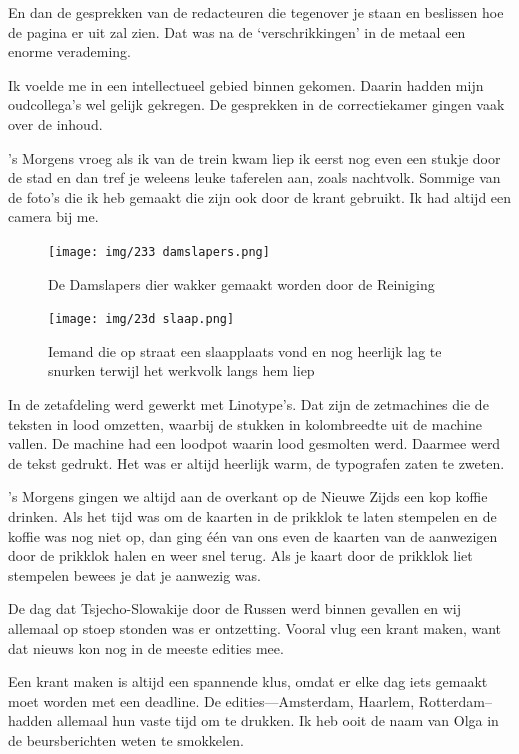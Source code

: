 \documentclass[10pt,twoside, openright]{memoir}
\begin{document}
En dan de gesprekken van de redacteuren die tegenover je staan en beslissen hoe de pagina er uit zal zien. Dat was na de `verschrikkingen' in de metaal een enorme verademing.

Ik voelde me in een intellectueel gebied binnen gekomen. Daarin hadden mijn oudcollega’s wel gelijk gekregen. De gesprekken in de correctiekamer gingen vaak over de inhoud. 

’s Morgens vroeg als ik van de trein kwam liep ik eerst nog even een stukje door de stad en dan tref je weleens leuke taferelen aan, zoals nachtvolk. Sommige van de foto’s die ik heb gemaakt die zijn ook door de krant gebruikt. Ik had altijd een camera bij me.

\begin{figure}
\texttt{[image: img/233 damslapers.png]}
\caption*{\footnotesize De Damslapers dier wakker gemaakt worden door de Reiniging}
\end{figure}

\begin{figure}
\texttt{[image: img/23d slaap.png]}
\caption*{\footnotesize Iemand die op straat een slaapplaats vond en nog heerlijk lag te snurken terwijl het werkvolk langs hem liep}
\end{figure}

In de zetafdeling werd gewerkt met Linotype's. Dat zijn de zetmachines die de teksten in lood omzetten, waarbij de stukken in kolombreedte uit de machine vallen. De machine had een loodpot waarin lood gesmolten werd. Daarmee werd de tekst gedrukt. Het was er altijd heerlijk warm, de typografen zaten te zweten.

's Morgens gingen we altijd aan de overkant op de Nieuwe Zijds een kop koffie drinken. Als het tijd was om de kaarten in de prikklok te laten stempelen en de koffie was nog niet op, dan ging één van ons even de kaarten van de aanwezigen door de prikklok halen en weer snel terug. Als je kaart door de prikklok liet stempelen bewees je dat je aanwezig was.

De dag dat Tsjecho-Slowakije door de Russen werd 
binnen gevallen en wij allemaal op stoep stonden was er ontzetting. Vooral vlug een krant maken, want dat nieuws kon nog in de meeste edities mee. 

Een krant maken is altijd een spannende klus, omdat er elke dag iets gemaakt moet worden met een deadline. De edities---Amsterdam, Haarlem, Rotterdam--hadden allemaal hun vaste tijd om te drukken. Ik heb ooit de naam van Olga in de beursberichten weten te smokkelen. 
\end{document}
